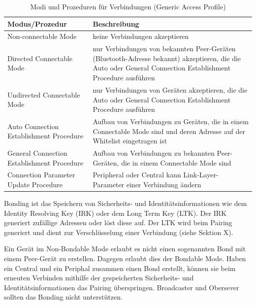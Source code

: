 \begin{table}
    \begin{tabularx}{\textwidth}{|p{4.5cm}|X|}
    \hline
    \textbf{Modus/Prozedur} & \textbf{Beschreibung} \\
    \hline
    Non-connectable Mode & keine Verbindungen akzeptieren \\
    \hline
    Directed Connectable Mode & nur Verbindungen von bekannten Peer-Geräten (Bluetooth-Adresse bekannt) akzeptieren, die die Auto oder General Connection Establishment Procedure ausführen \\
    \hline
    Undirected Connectable Mode & nur Verbindungen von Geräten akzeptieren, die die Auto oder General Connection Establishment Procedure ausführen \\
    \hline
    Auto Connection Establishment Procedure & Aufbau von Verbindungen zu Geräten, die in einem Connectable Mode sind und deren Adresse auf der Whitelist eingetragen ist \\
    \hline
    General Connection Establishment Procedure & Aufbau von Verbindungen zu bekannten Peer-Geräten, die in einem Connectable Mode sind \\
    \hline
    Connection Parameter Update Procedure & Peripheral oder Central kann Link-Layer-Parameter einer Verbindung ändern \\
    \hline
    \end{tabularx}
    \caption{Modi und Prozeduren für Verbindungen (Generic Access Profile)}
\end{table}

Bonding ist das Speichern von Sicherheits- und Identitätsinformationen wie dem Identity Resolving Key (IRK) oder dem Long Term Key (LTK). Der IRK generiert zufällige Adressen oder löst diese auf. Der LTK wird beim Pairing generiert und dient zur Verschlüsselung einer Verbindung (siehe Sektion X). 

Ein Gerät im Non-Bondable Mode erlaubt es nicht einen sogenannten Bond mit einem Peer-Gerät zu erstellen. Dagegen erlaubt dies der Bondable Mode. Haben ein Central und ein Periphal zusammen einen Bond erstellt, können sie beim erneuten Verbinden mithilfe der gespeicherten Sicherheits- und Identitätsinformationen das Pairing überspringen. Broadcaster und Obersever sollten das Bonding nicht unterstützen.

